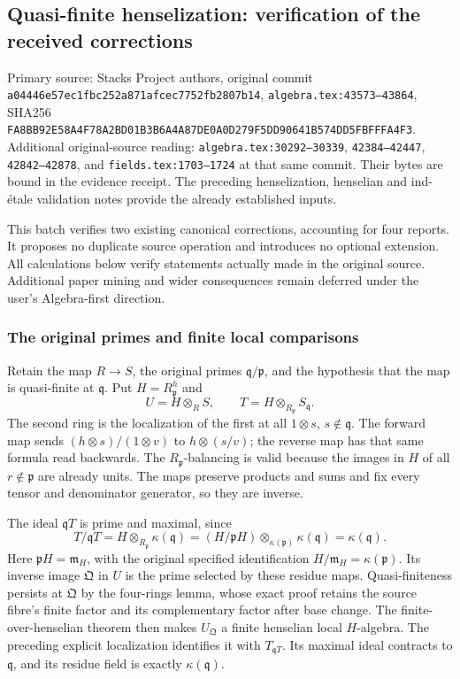 \subsection{Quasi-finite henselization: verification of the received corrections}\label{quasi-finite-henselization-verification-of-the-received-corrections}

Primary source: Stacks Project authors, original commit \texttt{a04446e57ec1fbc252a871afcec7752fb2807b14}, \texttt{algebra.tex:43573–43864}, SHA256 \texttt{FA8BB92E58A4F78A2BD01B3B6A4A87DE0A0D279F5DD90641B574DD5FBFFFA4F3}. Additional original-source reading: \texttt{algebra.tex:30292–30339}, \texttt{42384–42447}, \texttt{42842–42878}, and \texttt{fields.tex:1703–1724} at that same commit. Their bytes are bound in the evidence receipt. The preceding henselization, henselian and ind-étale validation notes provide the already established inputs.

This batch verifies two existing canonical corrections, accounting for four reports. It proposes no duplicate source operation and introduces no optional extension. All calculations below verify statements actually made in the original source. Additional paper mining and wider consequences remain deferred under the user's Algebra-first direction.

\subsubsection{The original primes and finite local comparisons}\label{the-original-primes-and-finite-local-comparisons}

Retain the map \(R\to S\), the original primes \(\mathfrak q/\mathfrak p\), and the hypothesis that the map is quasi-finite at \(\mathfrak q\). Put \(H=R_{\mathfrak p}^h\) and \[
 U=H\otimes_R S,\qquad
 T=H\otimes_{R_{\mathfrak p}}S_{\mathfrak q}.
\] The second ring is the localization of the first at all \(1\otimes s\), \(s\notin\mathfrak q\). The forward map sends \((h\otimes s)/(1\otimes v)\) to \(h\otimes(s/v)\); the reverse map has that same formula read backwards. The \(R_{\mathfrak p}\)-balancing is valid because the images in \(H\) of all \(r\notin\mathfrak p\) are already units. The maps preserve products and sums and fix every tensor and denominator generator, so they are inverse.

The ideal \(\mathfrak qT\) is prime and maximal, since \[
 T/\mathfrak qT
 =H\otimes_{R_{\mathfrak p}}\kappa(\mathfrak q)
 =(H/\mathfrak pH)\otimes_{\kappa(\mathfrak p)}\kappa(\mathfrak q)
 =\kappa(\mathfrak q).
\] Here \(\mathfrak pH=\mathfrak m_H\), with the original specified identification \(H/\mathfrak m_H=\kappa(\mathfrak p)\). Its inverse image \(\mathfrak Q\) in \(U\) is the prime selected by these residue maps. Quasi-finiteness persists at \(\mathfrak Q\) by the four-rings lemma, whose exact proof retains the source fibre's finite factor and its complementary factor after base change. The finite-over-henselian theorem then makes \(U_{\mathfrak Q}\) a finite henselian local \(H\)-algebra. The preceding explicit localization identifies it with \(T_{\mathfrak qT}\). Its maximal ideal contracts to \(\mathfrak q\), and its residue field is exactly \(\kappa(\mathfrak q)\).

